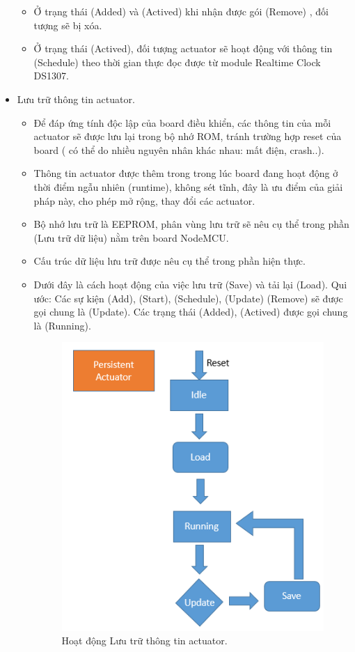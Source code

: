 \documentclass[a4paper,12pt,oneside]{article}
\begin{document}
\begin{itemize}
\begin{itemize}
	\item Ở trạng thái (Added) và (Actived) khi nhận được gói (Remove) , đối tượng sẽ bị xóa.
	\item Ở trạng thái (Actived), đối tượng actuator sẽ hoạt động với thông tin (Schedule) theo thời gian thực đọc được từ module Realtime Clock DS1307.
	\end{itemize}
\item Lưu trữ thông tin actuator.

	\begin{itemize}
	\item Để đáp ứng tính độc lập của board điều khiển, các thông tin của mỗi actuator sẽ được lưu lại trong bộ nhớ ROM, tránh trường hợp reset của board ( có thể do nhiều nguyên nhân khác nhau: mất điện, crash..).
	\item Thông tin actuator được thêm trong trong lúc board đang hoạt động ở thời điểm ngẫu nhiên (runtime), không sét tĩnh, đây là ưu điểm của giải pháp này, cho phép mở rộng, thay đổi các actuator.
	\item Bộ nhớ lưu trữ là EEPROM, phân vùng lưu trữ sẽ nêu cụ thể trong phần (Lưu trữ dữ liệu) nằm trên board NodeMCU.
	\item Cấu trúc dữ liệu lưu trữ được nêu cụ thể trong phần hiện thực.
	\item Dưới đây là cách hoạt động của việc lưu trữ (Save) và tải lại (Load). Qui ước: Các sự kiện (Add), (Start), (Schedule), (Update) (Remove) sẽ được gọi chung là (Update). Các trạng thái (Added), (Actived) được gọi chung là (Running).
	 
\begin{center}
\begin{figure}[h!]
\begin{center}
\includegraphics[scale=.6]{hinh/persistent_actuator.PNG}
\end{center}
\caption{Hoạt động Lưu trữ thông tin actuator.}
\end{figure}
\end{center}
	

\end{itemize}
\end{itemize}
\end{document}
